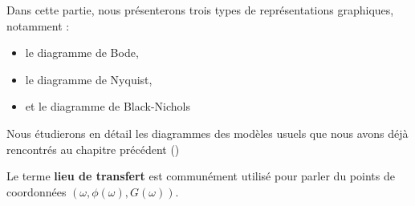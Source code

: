 Dans cette partie, nous présenterons trois types de représentations graphiques, 
notamment :
\begin{itemize}
    \item le diagramme de Bode,
    \item le diagramme de Nyquist,
    \item et le diagramme de Black-Nichols
\end{itemize}
Nous étudierons en détail les diagrammes des modèles usuels que nous 
avons déjà rencontrés au chapitre précédent ()

Le terme \textbf{lieu de transfert} est communément utilisé pour parler du 
points de coordonnées $(\omega, \phi(\omega),G(\omega))$.
